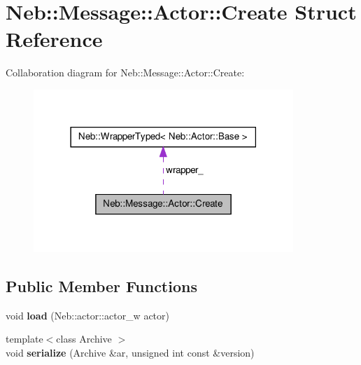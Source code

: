 \hypertarget{structNeb_1_1Message_1_1Actor_1_1Create}{\section{\-Neb\-:\-:\-Message\-:\-:\-Actor\-:\-:\-Create \-Struct \-Reference}
\label{structNeb_1_1Message_1_1Actor_1_1Create}
}


\-Collaboration diagram for \-Neb\-:\-:\-Message\-:\-:\-Actor\-:\-:\-Create\-:\nopagebreak
\begin{figure}[H]
\begin{center}
\leavevmode
\includegraphics[width=278pt]{structNeb_1_1Message_1_1Actor_1_1Create__coll__graph}
\end{center}
\end{figure}
\subsection*{\-Public \-Member \-Functions}
\begin{DoxyCompactItemize}
\item 
\hypertarget{structNeb_1_1Message_1_1Actor_1_1Create_aff6ea433625795e13837dadbf4c36bca}{void {\bfseries load} (\-Neb\-::actor\-::actor\-\_\-w actor)}\label{structNeb_1_1Message_1_1Actor_1_1Create_aff6ea433625795e13837dadbf4c36bca}

\item 
\hypertarget{structNeb_1_1Message_1_1Actor_1_1Create_a4805dfe7cf6d556732278330dd7f7c44}{{\footnotesize template$<$class Archive $>$ }\\void {\bfseries serialize} (\-Archive \&ar, unsigned int const \&version)}\label{structNeb_1_1Message_1_1Actor_1_1Create_a4805dfe7cf6d556732278330dd7f7c44}

\end{DoxyCompactItemize}
